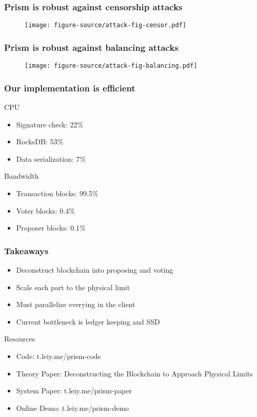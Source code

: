 \documentclass[aspectratio=169]{beamer}
\begin{document}
\begin{frame}
    \frametitle{Prism is robust against censorship attacks}
    \begin{figure}
        \centering
        \texttt{[image: figure-source/attack-fig-censor.pdf]}
    \end{figure}
\end{frame}

\begin{frame}
    \frametitle{Prism is robust against balancing attacks}
    \begin{figure}
        \centering
        \texttt{[image: figure-source/attack-fig-balancing.pdf]}
    \end{figure}
\end{frame}

\begin{frame}
    \frametitle{Our implementation is efficient}
    \begin{block}{CPU}
    \begin{itemize}
        \item Signature check: 22\%
        \item RocksDB: 53\%
        \item Data serialization: 7\%
    \end{itemize}
    \end{block}
    \begin{block}{Bandwidth}
    \begin{itemize}
        \item Transaction blocks: 99.5\%
        \item Voter blocks: 0.4\%
        \item Proposer blocks: 0.1\%
    \end{itemize}
    \end{block}
\end{frame}

\begin{frame}
    \frametitle{Takeaways}
    \begin{block}{}
    \begin{itemize}
        \item Deconstruct blockchain into \alert{proposing} and \alert{voting}
        \item Scale each part to the physical limit
        \item Must parallelize everying in the client
        \item Current bottleneck is ledger keeping and SSD
    \end{itemize}
    \end{block}
    \begin{block}{Resources}
    \begin{itemize}
        \item Code: t.leiy.me/prism-code
        \item Theory Paper: Deconstructing the Blockchain to Approach Physical Limits
        \item System Paper: t.leiy.me/prism-paper
        \item Online Demo: t.leiy.me/prism-demo
    \end{itemize}
    \end{block}
\end{frame}
\end{document}
